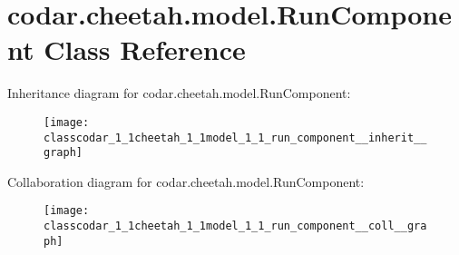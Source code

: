 \hypertarget{classcodar_1_1cheetah_1_1model_1_1_run_component}{}\section{codar.\+cheetah.\+model.\+Run\+Component Class Reference}
\label{classcodar_1_1cheetah_1_1model_1_1_run_component}


Inheritance diagram for codar.\+cheetah.\+model.\+Run\+Component\+:
\nopagebreak
\begin{figure}[H]
\begin{center}
\leavevmode
\texttt{[image: classcodar\_1\_1cheetah\_1\_1model\_1\_1\_run\_component\_\_inherit\_\_graph]}
\end{center}
\end{figure}


Collaboration diagram for codar.\+cheetah.\+model.\+Run\+Component\+:
\nopagebreak
\begin{figure}[H]
\begin{center}
\leavevmode
\texttt{[image: classcodar\_1\_1cheetah\_1\_1model\_1\_1\_run\_component\_\_coll\_\_graph]}
\end{center}
\end{figure}
